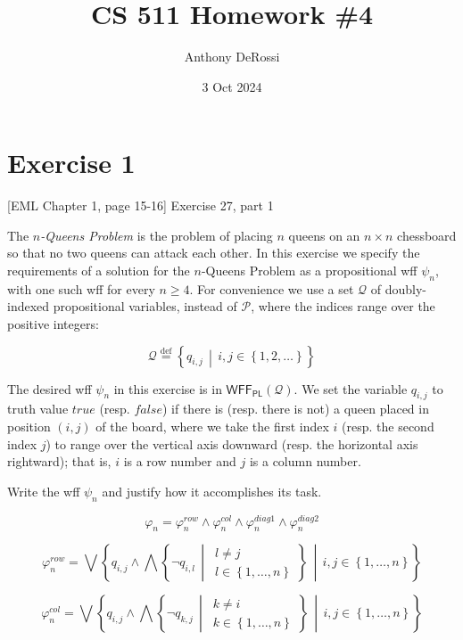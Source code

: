 \documentclass[12pt,leqno]{article}
\title{CS 511 Homework \#4}
\author{Anthony DeRossi}
\date{3 Oct 2024}
\newcommand{\DefEq}{\stackrel{\text{def}}{=}}
\newcommand{\Mid}{\,\middle\vert\,}
\begin{document}
\maketitle

\section*{Exercise 1}

[EML Chapter 1, page 15-16] Exercise 27, part 1

The \textit{$n$-Queens Problem} is the problem of placing $n$ queens on an $n
\times n$ chessboard so that no two queens can attack each other. In this
exercise we specify the requirements of a solution for the $n$-Queens Problem
as a propositional wff $\psi_n$, with one such wff for every $n \ge 4$. For
convenience we use a set $\mathcal{Q}$ of doubly-indexed propositional
variables, instead of $\mathcal{P}$, where the indices range over the positive
integers:

\[
  \mathcal{Q} \DefEq \left\{q_{i, j} \Mid i, j \in
    \left\{1, 2, \ldots\right\}\right\}
\]

The desired wff $\psi_n$ in this exercise is in
$\mathsf{WFF_{PL}}(\mathcal{Q})$. We set the variable $q_{i, j}$ to truth
value $true$ (resp. $false$) if there is (resp. there is not) a queen placed
in position $(i, j)$ of the board, where we take the first index $i$ (resp.
the second index $j$) to range over the vertical axis downward (resp. the
horizontal axis rightward); that is, $i$ is a row number and $j$ is a column
number.

Write the wff $\psi_n$ and justify how it accomplishes its task.

\newpage
\[
  \varphi_n = \varphi_n^{row} \land \varphi_n^{col} \land \varphi_n^{diag1}
    \land \varphi_n^{diag2}
\]

\[
  \varphi_n^{row} = \bigvee \left\{ q_{i, j} \land \bigwedge
    \left\{\lnot q_{i, l} \Mid \begin{array}{c}
      l \ne j \\
      l \in \left\{1, \ldots, n\right\}
    \end{array}\right\} \Mid i, j \in \left\{1, \ldots, n\right\} \right\}
\]

\[
  \varphi_n^{col} = \bigvee \left\{ q_{i, j} \land \bigwedge
    \left\{\lnot q_{k, j} \Mid \begin{array}{c}
      k \ne i \\
      k \in \left\{1, \ldots, n\right\}
    \end{array} \right\} \Mid i, j \in \left\{1, \ldots, n\right\} \right\}
\]
\end{document}
